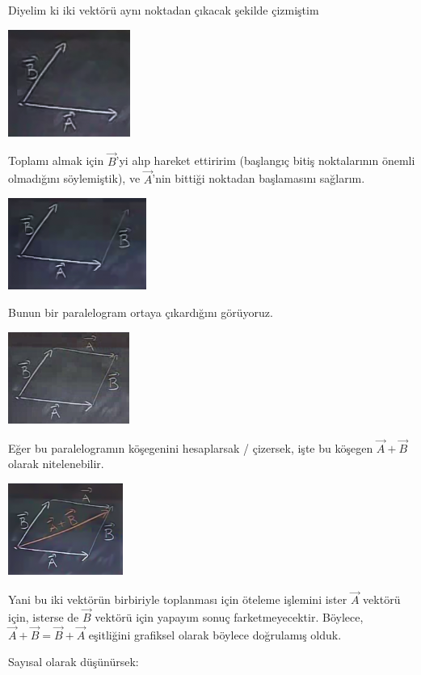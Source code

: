 \documentclass[12pt,fleqn]{article}\usepackage{../../common}
\begin{document}
Diyelim ki iki vektörü aynı noktadan çıkacak şekilde çizmiştim

\includegraphics[height=3.5cm]{1_6.png}

Toplamı almak için $\vec{B}$'yi alıp hareket ettiririm (başlangıç bitiş
noktalarının önemli olmadığını söylemiştik), ve $\vec{A}$'nin bittiği
noktadan başlamasını sağlarım.

\includegraphics[height=3cm]{1_7.png}

Bunun bir paralelogram ortaya çıkardığını görüyoruz. 

\includegraphics[height=3cm]{1_8.png}

Eğer bu paralelogramın köşegenini hesaplarsak / çizersek, işte bu köşegen
$\vec{A} + \vec{B}$ olarak nitelenebilir. 

\includegraphics[height=3cm]{1_9.png}

Yani bu iki vektörün birbiriyle toplanması için öteleme işlemini ister $\vec{A}$
vektörü için, isterse de $\vec{B}$ vektörü için yapayım sonuç
farketmeyecektir. Böylece, $\vec{A} + \vec{B} = \vec{B} + \vec{A}$ eşitliğini
grafiksel olarak böylece doğrulamış olduk.

Sayısal olarak düşünürsek:
\end{document}
